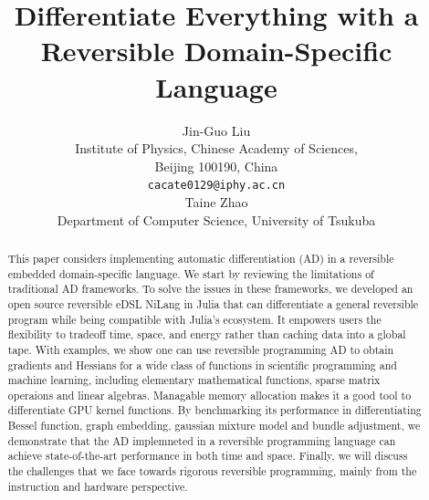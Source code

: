 \documentclass{article}
\newcommand{\<}{\langle}
\renewcommand{\>}{\rangle}
\theoremstyle{definition}\newtheorem{definition}{\textit{Definition}}
\begin{document}
\title{Differentiate Everything with a Reversible Domain-Specific Language}

\author{Jin-Guo Liu\\
Institute of Physics, Chinese Academy of Sciences,\\Beijing 100190, China\\
\texttt{cacate0129@iphy.ac.cn}\\
\And
Taine Zhao\\
Department of Computer Science, University of Tsukuba\\
}



\maketitle

\begin{abstract}
    This paper considers implementing automatic differentiation (AD) in a reversible embedded domain-specific language. We start by reviewing the limitations of traditional AD frameworks. To solve the issues in these frameworks, we developed an open source reversible eDSL NiLang in Julia that can differentiate a general reversible program while being compatible with Julia's ecosystem. It empowers users the flexibility to tradeoff time, space, and energy rather than caching data into a global tape. With examples, we show one can use reversible programming AD to obtain gradients and Hessians for a wide class of functions in scientific programming and machine learning, including elementary mathematical functions, sparse matrix operaions and linear algebras. Managable memory allocation makes it a good tool to differentiate GPU kernel functions.
By benchmarking its performance in differentiating Bessel function, graph embedding, gaussian mixture model and bundle adjustment, we demonstrate that the AD implemneted in a reversible programming language can achieve state-of-the-art performance in both time and space. Finally, we will discuss the challenges that we face towards rigorous reversible programming, mainly from the instruction and hardware perspective.
\end{abstract}
\end{document}
